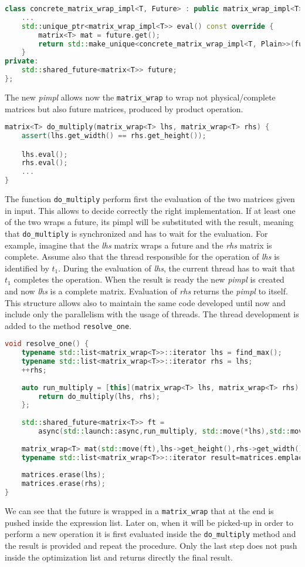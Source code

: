 \documentclass[10pt,a4paper]{article}
\begin{document}
\begin{lstlisting}[language=C++]
class concrete_matrix_wrap_impl<T, Future> : public matrix_wrap_impl<T> {
	...
	std::unique_ptr<matrix_wrap_impl<T>> eval() const override {
		matrix<T> mat = future.get();
		return std::make_unique<concrete_matrix_wrap_impl<T, Plain>>(future.get());
	}
private:
	std::shared_future<matrix<T>> future;
};
\end{lstlisting}
The new \textit{pimpl} allows now the \verb|matrix_wrap| to wrap not physical/complete matrices but also future matrices, produced by product operation.

\begin{lstlisting}[language=C++]
matrix<T> do_multiply(matrix_wrap<T> lhs, matrix_wrap<T> rhs) {
	assert(lhs.get_width() == rhs.get_height());

	lhs.eval();
	rhs.eval();
	...
}
\end{lstlisting}
The function \verb|do_multiply| perform first the evaluation of the two matrices given in input. This allows to decide correctly the right implementation. If at least one of the two wraps a future, its pimpl will be substituted with the result, meaning that \verb|do_multiply| is synchronized and has to wait for the evaluation. For example, imagine that the \textit{lhs} matrix wraps a future and the \textit{rhs} matrix is complete. Assume also that the thread responsible for the operation of \textit{lhs} is identified by $t_1$. During the evaluation of \textit{lhs}, the current thread has to wait that $t_1$ completes the operation. When the result is ready the new \textit{pimpl} is created and now \textit{lhs} is a complete matrix. Evaluation of \textit{rhs} returns the \textit{pimpl} to itself. This structure allows also to maintain the same code developed until now and include only the parallelism with the usage of threads. The thread development is added to the method \verb|resolve_one|.
\begin{lstlisting}[language=C++]
void resolve_one() {
	typename std::list<matrix_wrap<T>>::iterator lhs = find_max();
	typename std::list<matrix_wrap<T>>::iterator rhs = lhs;
	++rhs;
	
	auto run_multiply = [this](matrix_wrap<T> lhs, matrix_wrap<T> rhs) {
		return do_multiply(lhs, rhs);
	};
	
	std::shared_future<matrix<T>> ft =
		async(std::launch::async,run_multiply, std::move(*lhs),std::move(*rhs));
	
	matrix_wrap<T> mat(std::move(ft),lhs->get_height(),rhs->get_width());
	typename std::list<matrix_wrap<T>>::iterator result=matrices.emplace(lhs,mat);
	
	matrices.erase(lhs);
	matrices.erase(rhs);
}
\end{lstlisting}
We can see that the future is wrapped in a \verb|matrix_wrap| that at the end is pushed inside the expression list. Later on, when it will be picked-up in order to perform a new operation it is first evaluated inside the \verb|do_multiply| method and the result is provided and repeat the procedure. Only the last step does not push inside the optimization list and returns directly the final result.
\end{document}
